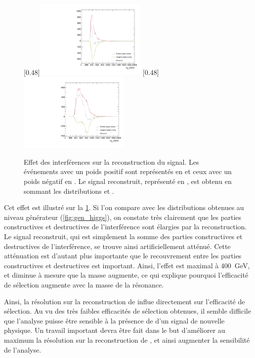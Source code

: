 \begin{figure}[tbp] \centering
    [0.48\textwidth]{\includegraphics[width=0.48\textwidth,origin=c,angle=-90]{chapitre8/figs/S0/s0_positive_negative_pseudoscalar_400.pdf}}
    [0.48\textwidth]{\includegraphics[width=0.48\textwidth,origin=c,angle=-90]{chapitre8/figs/S0/s0_positive_negative_scalar_800.pdf}}
    \caption{Effet des interférences sur la reconstruction du signal. Les événements avec un poids positif sont représentés en \rouge et ceux avec un poids négatif en \vertc. Le signal reconstruit, représenté en \gris, est obtenu en sommant les distributions \rouge et \vertc.}
    \label{fig:interference_effet}
\end{figure}

Cet effet est illustré sur la \cref{fig:interference_effet}. Si l'on compare avec les distributions obtenues au niveau générateur (\cref{fig:gen_higgs}), on constate très clairement que les parties constructives et destructives de l'interférence sont élargies par la reconstruction. Le signal reconstruit, qui est simplement la somme des parties constructives et destructives de l'interférence, se trouve ainsi artificiellement atténué. Cette atténuation est d'autant plus importante que le recouvrement entre les parties constructives et destructives est important. Ainsi, l'effet est maximal à \SI{400}{\GeV}, et diminue à mesure que la masse augmente, ce qui explique pourquoi l'efficacité de sélection augmente avec la masse de la résonance.

Ainsi, la résolution sur la reconstruction de \mtt influe directement sur l'efficacité de sélection. Au vu des très faibles efficacités de sélection obtenues, il semble difficile que l'analyse puisse être sensible à la présence de d'un signal de nouvelle physique. Un travail important devra être fait dans le but d'améliorer au maximum la résolution sur la reconstruction de \mtt, et ainsi augmenter la sensibilité de l'analyse.

